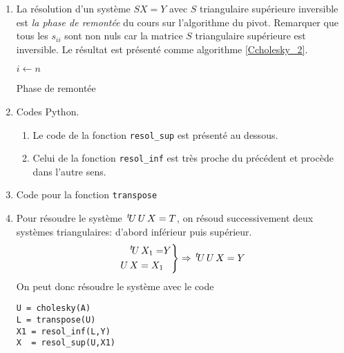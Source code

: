 \begin{enumerate}
 \item La résolution d'un système $SX =Y$ avec $S$ triangulaire supérieure inversible est \emph{la phase de remontée} du cours sur l'algorithme du pivot. Remarquer que tous les $s_{i i}$ sont non nuls car la matrice $S$ triangulaire supérieure est inversible. Le résultat est présenté comme algorithme \ref{Ccholesky_2}.
 \begin{algorithm}
 $i \leftarrow n$\;
 \caption{Phase de remontée}
 \label{Ccholesky_2}
\end{algorithm}
  
  \item Codes Python.
\begin{enumerate}
\item Le code de la fonction \texttt{resol\_sup} est présenté au dessous.


\item Celui de la fonction \texttt{resol\_inf} est très proche du précédent et procède dans l'autre sens.

\end{enumerate}

 \item Code pour la fonction \texttt{transpose}


 \item Pour résoudre le système $\,\mathstrut^t\! U\, U\, X = T$, on résoud successivement deux systèmes triangulaires: d'abord inférieur puis supérieur.
\begin{displaymath}
\left. 
\begin{aligned}
 \,\mathstrut^t\! U\, X_1 =& Y \\ U\, X = X_1
\end{aligned}
\right\rbrace 
\Rightarrow 
\,\mathstrut^t\! U\, U\, X = Y
\end{displaymath}
On peut donc résoudre le système avec le code
\begin{verbatim}
U = cholesky(A)
L = transpose(U)
X1 = resol_inf(L,Y)
X  = resol_sup(U,X1)
\end{verbatim} 
\end{enumerate}

